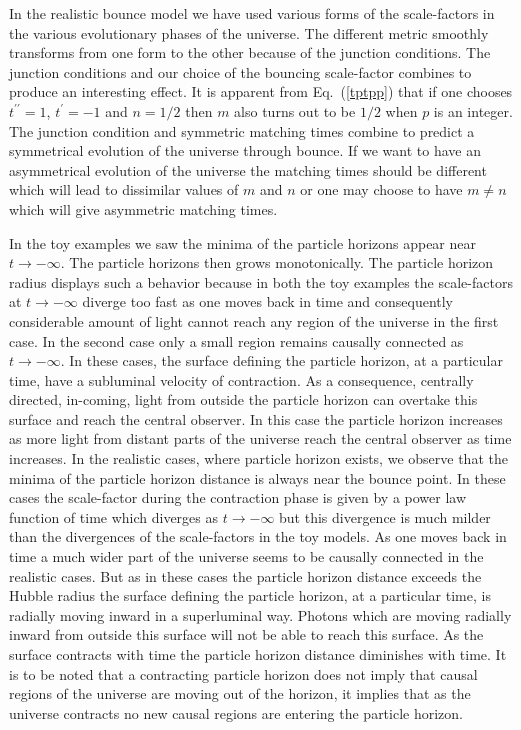 \documentclass[24pt]{article}
\begin{document}
In the realistic bounce model we have used various forms of the
scale-factors in the various evolutionary phases of the universe. The
different metric smoothly transforms from one form to the other
because of the junction conditions. The junction conditions and our
choice of the bouncing scale-factor combines to produce an interesting
effect. It is apparent from Eq.~(\ref{tptpp}) that if one chooses
$t^{\prime\prime}=1$, $t^\prime=-1$ and $n=1/2$ then $m$ also turns
out to be $1/2$ when $p$ is an integer. The junction condition and
symmetric matching times combine to predict a symmetrical evolution of
the universe through bounce. If we want to have an asymmetrical
evolution of the universe the matching times should be different which
will lead to dissimilar values of $m$ and $n$ or one may choose to
have $m \ne n$ which will give asymmetric matching times.

In the toy examples we saw the minima of the particle horizons appear
near $t \to -\infty$. The particle horizons then grows
monotonically. The particle horizon radius displays such a behavior
because in both the toy examples the scale-factors at $t \to -\infty$
diverge too fast as one moves back in time and consequently
considerable amount of light cannot reach any region of the universe
in the first case. In the second case only a small region remains
causally connected as $t \to -\infty$. In these cases, the surface
defining the particle horizon, at a particular time, have a subluminal
velocity of contraction. As a consequence, centrally directed,
in-coming, light from outside the particle horizon can overtake this
surface and reach the central observer. In this case the particle
horizon increases as more light from distant parts of the universe
reach the central observer as time increases. In the realistic cases,
where particle horizon exists, we observe that the minima of the
particle horizon distance is always near the bounce point. In these
cases the scale-factor during the contraction phase is given by a
power law function of time which diverges as $t \to -\infty$ but this
divergence is much milder than the divergences of the scale-factors in
the toy models. As one moves back in time a much wider part of the
universe seems to be causally connected in the realistic cases.  But
as in these cases the particle horizon distance exceeds the Hubble
radius the surface defining the particle horizon, at a particular
time, is radially moving inward in a superluminal way. Photons which
are moving radially inward from outside this surface will not be able
to reach this surface.  As the surface contracts with time the
particle horizon distance diminishes with time. It is to be noted that
a contracting particle horizon does not imply that causal regions of
the universe are moving out of the horizon, it implies that as the
universe contracts no new causal regions are entering the particle
horizon. 
\end{document}
